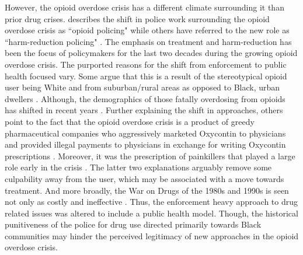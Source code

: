 However, the opioid overdose crisis has a different climate surrounding it than prior drug crises. \textcite{fedders_opioid_2019} describes the shift in police work surrounding the opioid overdose crisis as ``opioid policing" while others have referred to the new role as ``harm-reduction policing" \parencite{beckett_uses_2016}. The emphasis on treatment and harm-reduction has been the focus of policymakers for the last two decades during the growing opioid overdose crisis. The purported reasons for the shift from enforcement to public health focused vary. Some argue that this is a result of the stereotypical opioid user being White and from suburban/rural areas as opposed to Black, urban dwellers \parencite{hart_opioid_2019}. Although, the demographics of those fatally overdosing from opioids has shifted in recent years \parencite{humphreys_responding_2022}. Further explaining the shift in approaches, others point to the fact that the opioid overdose crisis is a product of greedy pharmaceutical companies who aggressively marketed Oxycontin to physicians and provided illegal payments to physicians in exchange for writing Oxycontin prescriptions \parencite{hoffman_purdue_2020}. Moreover, it was the prescription of painkillers that played a large role early in the crisis \parencite{dasgupta_opioid_2018}. The latter two explanations arguably remove some culpability away from the user, which may be associated with a move towards treatment. And more broadly, the War on Drugs of the 1980s and 1990s is seen not only as costly and ineffective \parencite{mitchell_criminal_2011}. Thus, the enforcement heavy approach to drug related issues was altered to include a public health model. Though, the historical punitiveness of the police for drug use directed primarily towards Black communities may hinder the perceived legitimacy of new approaches in the opioid overdose crisis. 

